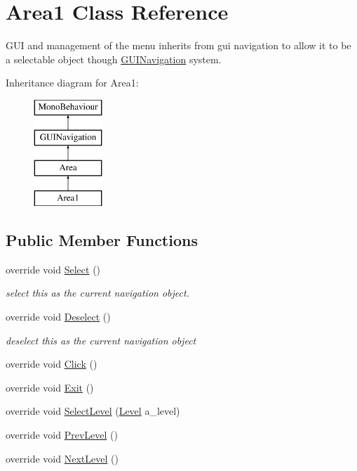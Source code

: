 \hypertarget{class_area1}{}\section{Area1 Class Reference}
\label{class_area1}


G\+UI and management of the menu inherits from gui navigation to allow it to be a selectable object though \mbox{\hyperlink{class_g_u_i_navigation}{G\+U\+I\+Navigation}} system.  


Inheritance diagram for Area1\+:\begin{figure}[H]
\begin{center}
\leavevmode
\includegraphics[height=4.000000cm]{class_area1}
\end{center}
\end{figure}
\subsection*{Public Member Functions}
\begin{DoxyCompactItemize}
\item 
override void \mbox{\hyperlink{class_area1_a007f43862f61bfad75a3df88ed84f5e1}{Select}} ()
\begin{DoxyCompactList}\small\item\em select this as the current navigation object. \end{DoxyCompactList}\item 
override void \mbox{\hyperlink{class_area1_a3acaa8f39aa82c44a227cd908509eb23}{Deselect}} ()
\begin{DoxyCompactList}\small\item\em deselect this as the current navigation object \end{DoxyCompactList}\item 
override void \mbox{\hyperlink{class_area1_abe3e9544cd582f84468323ec7d254d32}{Click}} ()
\item 
override void \mbox{\hyperlink{class_area1_afe0c3d9815116a2467fb75b4c2e71df7}{Exit}} ()
\item 
override void \mbox{\hyperlink{class_area1_aa49025530816d90d96ec3665b4f727d2}{Select\+Level}} (\mbox{\hyperlink{class_level}{Level}} a\+\_\+level)
\item 
override void \mbox{\hyperlink{class_area1_af49f1117a0338b89224481a3708b57d9}{Prev\+Level}} ()
\item 
override void \mbox{\hyperlink{class_area1_a232eae9b5f4ebdc861d036654b947303}{Next\+Level}} ()
\end{DoxyCompactItemize}
